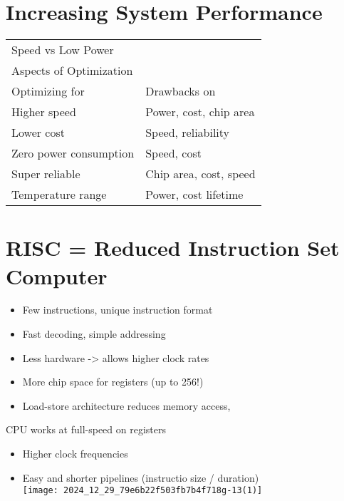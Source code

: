 \section{Increasing System Performance}

\begin{center}
    \begin{tabular}{|l|l|}
    \hline
    Speed vs Low Power &  \\
    Aspects of Optimization &  \\
    \hline
    Optimizing for & Drawbacks on \\
    \hline
    Higher speed & Power, cost, chip area \\
    \hline
    Lower cost & Speed, reliability \\
    \hline
    Zero power consumption & Speed, cost \\
    \hline
    Super reliable & Chip area, cost, speed \\
    \hline
    Temperature range & Power, cost lifetime \\
    \hline
    \end{tabular}
    \end{center}
    
    \section*{RISC = Reduced Instruction Set Computer}
    \begin{itemize}
      \item Few instructions, unique instruction format
      \item Fast decoding, simple addressing
      \item Less hardware -> allows higher clock rates
      \item More chip space for registers (up to 256!)
      \item Load-store architecture reduces memory access,
    \end{itemize}
    
    CPU works at full-speed on registers
    
    \begin{itemize}
      \item Higher clock frequencies
      \item Easy and shorter pipelines (instructio size / duration)\\
    \texttt{[image: 2024\_12\_29\_79e6b22f503fb7b4f718g-13(1)]}
    \end{itemize}
    
